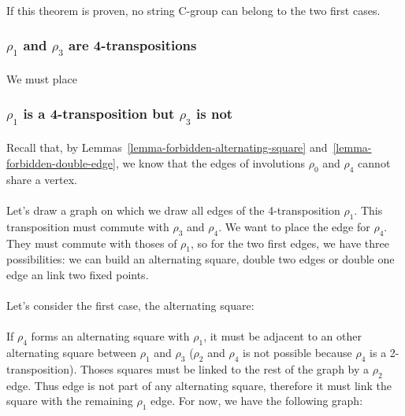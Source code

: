 \paragraph{}
If this theorem is proven, no string C-group can belong to the two first cases.

\subsubsection{$\rho_1$ and $\rho_3$ are 4-transpositions}

\paragraph{}
We must place

\subsubsection{$\rho_1$ is a 4-transposition but $\rho_3$ is not}

\paragraph{}
Recall that, by Lemmas~\ref{lemma-forbidden-alternating-square} and~\ref{lemma-forbidden-double-edge}, we know that the edges of involutions $\rho_0$ and $\rho_4$ cannot share a vertex.

\paragraph{}
Let's draw a graph on which we draw all edges of the 4-transposition $\rho_1$. This transposition must commute with $\rho_3$ and $\rho_4$. We want to place the edge for $\rho_4$. They must commute with thoses of $\rho_1$, so for the two first edges, we have three possibilities: we can build an alternating square, double two edges or double one edge an link two fixed points.

\paragraph{}
Let's consider the first case, the alternating square:

\paragraph{}
If $\rho_4$ forms an alternating square with $\rho_1$, it must be adjacent to an other alternating square between $\rho_1$ and $\rho_3$ ($\rho_2$ and $\rho_4$ is not possible because $\rho_4$ is a 2-transposition). Thoses squares must be linked to the rest of the graph by a $\rho_2$ edge. Thus edge is not part of any alternating square, therefore it must link the square with the remaining $\rho_1$ edge. For now, we have the following graph:

